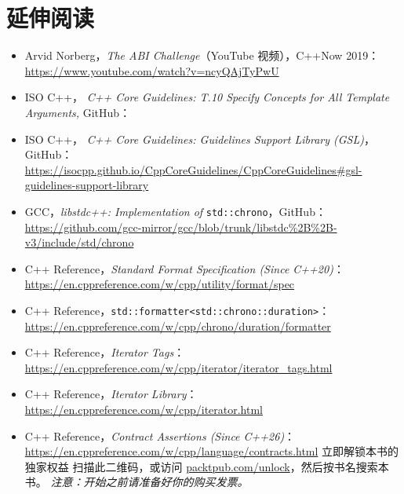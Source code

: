 \section{延伸阅读}

\begin{itemize}
\item Arvid Norberg，\emph{The ABI Challenge}（YouTube 视频），C++Now 2019：\href{https://www.youtube.com/watch?v=ncyQAjTyPwU}{https://www.youtube.com/watch?v=ncyQAjTyPwU}
\item ISO C++，\emph{ C++ Core Guidelines: T.10 Specify Concepts for All Template Arguments, }GitHub：
\item ISO C++，\emph{ C++ Core Guidelines: Guidelines Support Library (GSL)}，GitHub：\href{https://isocpp.github.io/CppCoreGuidelines/CppCoreGuidelines\#gsl-guidelines-support-library}{https://isocpp.github.io/CppCoreGuidelines/CppCoreGuidelines\#gsl-guidelines-support-library}
\item GCC，\emph{libstdc++: Implementation of} \texttt{std::\allowbreak{}chrono}，GitHub：\href{https://github.com/gcc-mirror/gcc/blob/trunk/libstdc\%2B\%2B-v3/include/std/chrono}{https://github.com/gcc-mirror/gcc/blob/trunk/libstdc\%2B\%2B-v3/include/std/chrono}
\item C++ Reference，\emph{Standard Format Specification (Since C++20)}：\href{https://en.cppreference.com/w/cpp/utility/format/spec}{https://en.cppreference.com/w/cpp/utility/format/spec}
\item C++ Reference，\texttt{std::\allowbreak{}formatter<std::\allowbreak{}chrono::\allowbreak{}duration>}：\href{https://en.cppreference.com/w/cpp/chrono/duration/formatter}{https://en.cppreference.com/w/cpp/chrono/duration/formatter}
\item C++ Reference，\emph{Iterator Tags}：\href{https://en.cppreference.com/w/cpp/iterator/iterator_tags.html}{https://en.cppreference.com/w/cpp/iterator/iterator\_tags.html}
\item C++ Reference，\emph{Iterator Library}：\href{https://en.cppreference.com/w/cpp/iterator.html}{https://en.cppreference.com/w/cpp/iterator.html}
\item C++ Reference，\emph{Contract Assertions (Since C++26)}：\href{https://en.cppreference.com/w/cpp/language/contracts.html}{https://en.cppreference.com/w/cpp/language/contracts.html} 立即解锁本书的独家权益 扫描此二维码，或访问 \href{http://packtpub.com/unlock}{packtpub.com/unlock}，然后按书名搜索本书。 \emph{注意：开始之前请准备好你的购买发票。}
\end{itemize}
